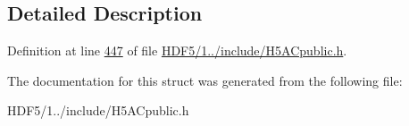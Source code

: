 \subsection{Detailed Description}


Definition at line \hyperlink{_h_d_f5_21_810_81_2include_2_h5_a_cpublic_8h_source_l00447}{447} of file \hyperlink{_h_d_f5_21_810_81_2include_2_h5_a_cpublic_8h_source}{H\+D\+F5/1../include/\+H5\+A\+Cpublic.\+h}.



The documentation for this struct was generated from the following file\+:\begin{DoxyCompactItemize}
\item 
H\+D\+F5/1../include/\+H5\+A\+Cpublic.\+h\end{DoxyCompactItemize}

